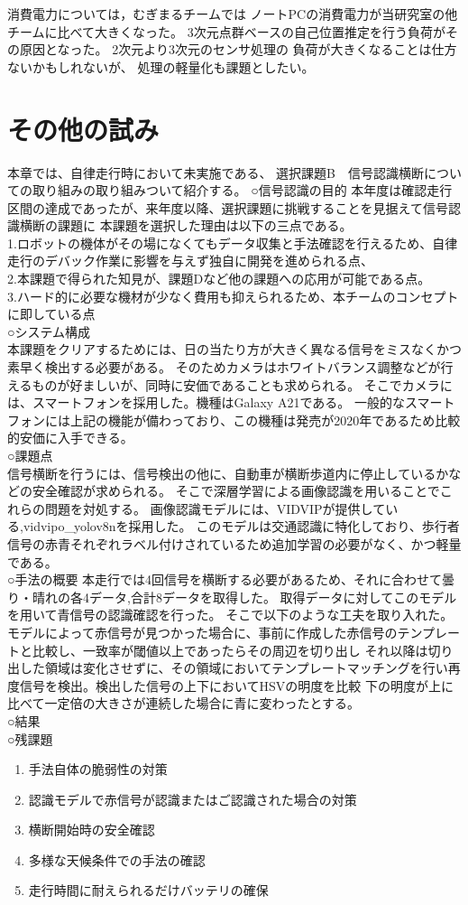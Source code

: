 \documentclass[twocolumn,9pt]{jsproceedings}
\begin{document}
消費電力については，むぎまるチームでは
ノートPCの消費電力が当研究室の他チームに比べて大きくなった。
3次元点群ベースの自己位置推定を行う負荷がその原因となった。
2次元より3次元のセンサ処理の
負荷が大きくなることは仕方ないかもしれないが、
処理の軽量化も課題としたい。

\section{その他の試み}
本章では、自律走行時において未実施である、
選択課題B　信号認識横断についての取り組みの取り組みついて紹介する。
○信号認識の目的
本年度は確認走行区間の達成であったが、来年度以降、選択課題に挑戦することを見据えて信号認識横断の課題に
本課題を選択した理由は以下の三点である。
\\1.ロボットの機体がその場になくてもデータ収集と手法確認を行えるため、自律走行のデバック作業に影響を与えず独自に開発を進められる点、
\\2.本課題で得られた知見が、課題Dなど他の課題への応用が可能である点。
\\3.ハード的に必要な機材が少なく費用も抑えられるため、本チームのコンセプトに即している点
\\○システム構成
\\本課題をクリアするためには、日の当たり方が大きく異なる信号をミスなくかつ素早く検出する必要がある。
そのためカメラはホワイトバランス調整などが行えるものが好ましいが、同時に安価であることも求められる。
そこでカメラには、スマートフォンを採用した。機種はGalaxy A21である。
一般的なスマートフォンには上記の機能が備わっており、この機種は発売が2020年であるため比較的安価に入手できる。
\\○課題点
\\信号横断を行うには、信号検出の他に、自動車が横断歩道内に停止しているかなどの安全確認が求められる。
そこで深層学習による画像認識を用いることでこれらの問題を対処する。
画像認識モデルには、VIDVIP\cite{BabaVIDVIP}が提供している,vidvipo\_yolov8nを採用した。
このモデルは交通認識に特化しており、歩行者信号の赤青それぞれラベル付けされているため追加学習の必要がなく、かつ軽量である。
\\○手法の概要
本走行では4回信号を横断する必要があるため、それに合わせて曇り・晴れの各4データ,合計8データを取得した。
取得データに対してこのモデルを用いて青信号の認識確認を行った。
そこで以下のような工夫を取り入れた。
モデルによって赤信号が見つかった場合に、事前に作成した赤信号のテンプレートと比較し、一致率が閾値以上であったらその周辺を切り出し
それ以降は切り出した領域は変化させずに、その領域においてテンプレートマッチングを行い再度信号を検出。検出した信号の上下においてHSVの明度を比較
下の明度が上に比べて一定倍の大きさが連続した場合に青に変わったとする。
\\○結果
\\○残課題
\begin{enumerate}
  \item 手法自体の脆弱性の対策
  \item 認識モデルで赤信号が認識またはご認識された場合の対策
  \item 横断開始時の安全確認
  \item 多様な天候条件での手法の確認
  \item 走行時間に耐えられるだけバッテリの確保
\end{enumerate}
\end{document}
